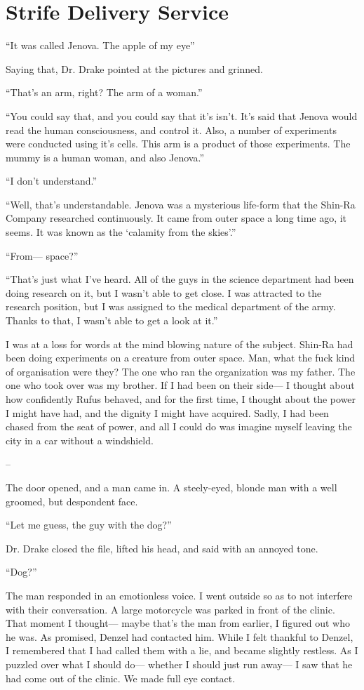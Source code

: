\documentclass[oneside]{book}
\begin{document}
\chapter{Strife Delivery Service}
“It was called Jenova. The apple of my eye”

Saying that, Dr. Drake pointed at the pictures and grinned.

“That’s an arm, right? The arm of a woman.”

“You could say that, and you could say that it’s isn’t. It’s said that Jenova would read the human consciousness, and control it. Also, a number of experiments were conducted using it’s cells. This arm is a product of those experiments. The mummy is a human woman, and also Jenova.”

“I don’t understand.”

“Well, that’s understandable. Jenova was a mysterious life-form that the Shin-Ra Company researched continuously. It came from outer space a long time ago, it seems. It was known as the ‘calamity from the skies’.”

“From— space?”

“That’s just what I’ve heard. All of the guys in the science department had been doing research on it, but I wasn’t able to get close. I was attracted to the research position, but I was assigned to the medical department of the army. Thanks to that, I wasn’t able to get a look at it.”

I was at a loss for words at the mind blowing nature of the subject. Shin-Ra had been doing experiments on a creature from outer space. Man, what the fuck kind of organisation were they? The one who ran the organization was my father. The one who took over was my brother. If I had been on their side— I thought about how confidently Rufus behaved, and for the first time, I thought about the power I might have had, and the dignity I might have acquired. Sadly, I had been chased from the seat of power, and all I could do was imagine myself leaving the city in a car without a windshield.

–

The door opened, and a man came in. A steely-eyed, blonde man with a well groomed, but despondent face.

“Let me guess, the guy with the dog?”

Dr. Drake closed the file, lifted his head, and said with an annoyed tone.

“Dog?”

The man responded in an emotionless voice. I went outside so as to not interfere with their conversation. A large motorcycle was parked in front of the clinic. That moment I thought— maybe that’s the man from earlier, I figured out who he was. As promised, Denzel had contacted him. While I felt thankful to Denzel, I remembered that I had called them with a lie, and became slightly restless. As I puzzled over what I should do— whether I should just run away— I saw that he had come out of the clinic. We made full eye contact.
\end{document}
